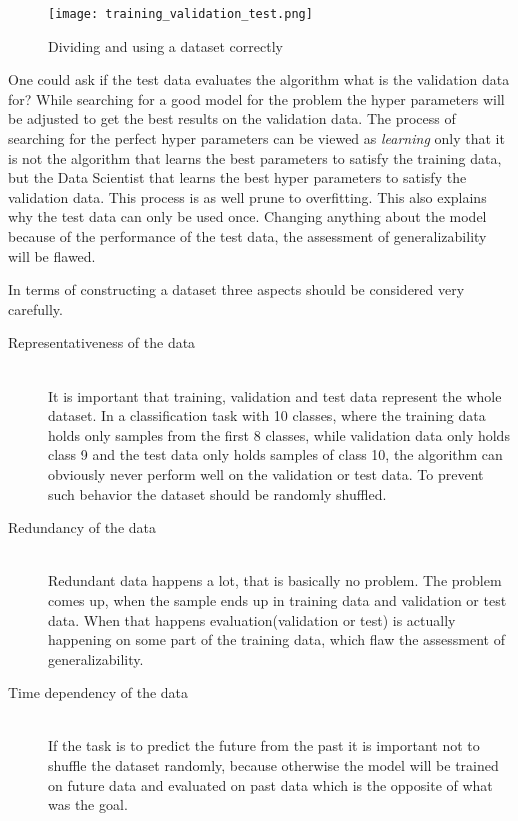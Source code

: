 \begin{figure}
\centering
  \texttt{[image: training\_validation\_test.png]}
  \caption{Dividing and using a dataset correctly \cite{DataSplit}}
  \label{fig:dataSplit}
\end{figure}


One could ask if the test data evaluates the algorithm what is the validation data for?
While searching for a good model for the problem the hyper parameters will be adjusted to get the best results on the validation data. 
The process of searching for the perfect hyper parameters can be viewed as \emph{learning} only that it is not the algorithm that learns the best parameters to satisfy the training data, but the Data Scientist that learns the best hyper parameters to satisfy the validation data. This process is as well prune to overfitting.
This also explains why the test data can only be used once.
Changing anything about the model because of the performance of the test data, the assessment of generalizability will be flawed.

In terms of constructing a dataset three aspects should be considered very carefully.

\begin{description}
\item[Representativeness of the data]\hfill \\
It is important that training, validation and test data represent the whole dataset. 
In a classification task with 10 classes, where the training data holds only samples from the first 8 classes, while validation data only holds class 9 and the test data only holds samples of class 10, the algorithm can obviously never perform well on the validation or test data. 
To prevent such behavior the dataset should be randomly shuffled.
\item[Redundancy of the data]\hfill \\ 
Redundant data happens a lot, that is basically no problem. 
The problem comes up, when the sample ends up in training data and validation or test data.
When that happens evaluation(validation or test) is actually happening on some part of the training data, which flaw the assessment of generalizability.
\item[Time dependency of the data]\hfill \\ 
If the task is to predict the future from the past it is important not to shuffle the dataset randomly, because otherwise the model will be trained on future data and evaluated on past data which is the opposite of what was the goal.
\end{description}

